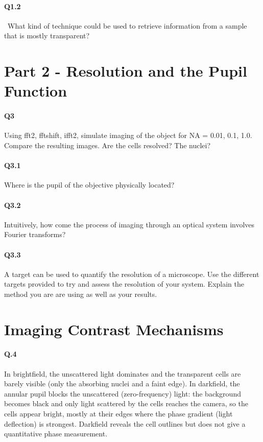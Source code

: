 \documentclass[12pt]{article}
\begin{document}
\paragraph{Q1.2} What kind of technique could be used to retrieve information from a sample that is
mostly transparent?



\section{Part 2 - Resolution and the Pupil Function}

\paragraph{Q3} Using fft2, fftshift, ifft2, simulate imaging of the object for NA = 0.01, 0.1, 1.0.
Compare the resulting images. Are the cells resolved? The nuclei?

\paragraph{Q3.1} Where is the pupil of the objective physically located?

\paragraph{Q3.2} Intuitively, how come the process of imaging through an optical system involves
Fourier transforms?

\paragraph{Q3.3} A target can be used to quantify the resolution of a microscope. Use the different
targets provided to try and assess the resolution of your system. Explain the method you
are are using as well as your results.



\section{Imaging Contrast Mechanisms}
\paragraph{Q.4}
In brightfield, the unscattered light dominates and the transparent cells are barely visible (only the absorbing 
nuclei and a faint edge). In darkfield, the annular pupil blocks the unscattered (zero-frequency) 
light: the background becomes black and only light scattered by the cells reaches the camera, so the cells appear bright, 
mostly at their edges where the phase gradient (light deflection) is strongest. 
Darkfield reveals the cell outlines but does not give a quantitative phase measurement.
\end{document}
